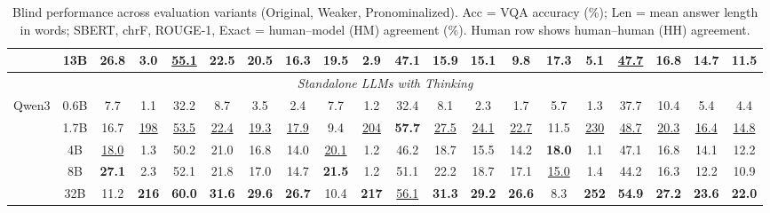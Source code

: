 \begin{table}[t]
{\begin{tabular}{lc|cccccc|cccccc|cccccc}
 & 13B & 26.8 & 3.0 & \underline{55.1} & 22.5 & 20.5 & 16.3 & 19.5 & 2.9 & 47.1 & 15.9 & 15.1 & 9.8 & 17.3 & 5.1 & \underline{47.7} & 16.8 & 14.7 & 11.5 \\
\midrule
\multicolumn{20}{c}{\textit{Standalone LLMs with Thinking}} \\
\midrule
\multirow{5}{*}{Qwen3} & 0.6B & 7.7 & 1.1 & 32.2 & 8.7 & 3.5 & 2.4 & 7.7 & 1.2 & 32.4 & 8.1 & 2.3 & 1.7 & 5.7 & 1.3 & 37.7 & 10.4 & 5.4 & 4.4 \\
 & 1.7B & 16.7 & \underline{198} & \underline{53.5} & \underline{22.4} & \underline{19.3} & \underline{17.9} & 9.4 & \underline{204} & \textbf{57.7} & \underline{27.5} & \underline{24.1} & \underline{22.7} & 11.5 & \underline{230} & \underline{48.7} & \underline{20.3} & \underline{16.4} & \underline{14.8} \\
 & 4B & \underline{18.0} & 1.3 & 50.2 & 21.0 & 16.8 & 14.0 & \underline{20.1} & 1.2 & 46.2 & 18.7 & 15.5 & 14.2 & \textbf{18.0} & 1.1 & 47.1 & 16.8 & 14.1 & 12.2 \\
 & 8B & \textbf{27.1} & 2.3 & 52.1 & 21.8 & 17.0 & 14.7 & \textbf{21.5} & 1.2 & 51.1 & 22.2 & 18.7 & 17.1 & \underline{15.0} & 1.4 & 44.2 & 16.3 & 12.2 & 10.9 \\
 & 32B & 11.2 & \textbf{216} & \textbf{60.0} & \textbf{31.6} & \textbf{29.6} & \textbf{26.7} & 10.4 & \textbf{217} & \underline{56.1} & \textbf{31.3} & \textbf{29.2} & \textbf{26.6} & 8.3 & \textbf{252} & \textbf{54.9} & \textbf{27.2} & \textbf{23.6} & \textbf{22.0} \\
\bottomrule
\end{tabular}
}
\caption{\small Blind performance across evaluation variants (Original, Weaker, Pronominalized). Acc = VQA accuracy (\%); Len = mean answer length in words; SBERT, chrF, ROUGE-1, Exact = human--model (HM) agreement (\%). Human row shows human--human (HH) agreement.}
\label{tab:comprehensive_inst_blind_w5}
\end{table}
